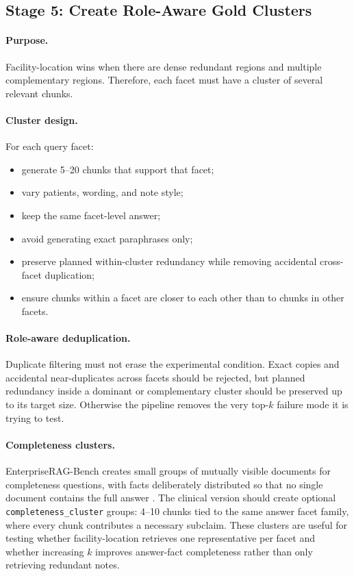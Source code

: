 \documentclass[11pt,a4paper]{article}
\newcommand{\field}[1]{\texttt{#1}}
\newcommand{\stage}[2]{\subsection{\textcolor{betterblue}{#1}: #2}}
\begin{document}
\stage{Stage 5}{Create Role-Aware Gold Clusters}

\paragraph{Purpose.}
Facility-location wins when there are dense redundant regions and multiple complementary regions. Therefore, each facet must have a cluster of several relevant chunks.

\paragraph{Cluster design.}
For each query facet:

\begin{itemize}[leftmargin=*]
	\item generate 5--20 chunks that support that facet;
	\item vary patients, wording, and note style;
	\item keep the same facet-level answer;
	\item avoid generating exact paraphrases only;
	\item preserve planned within-cluster redundancy while removing accidental cross-facet duplication;
	\item ensure chunks within a facet are closer to each other than to chunks in other facets.
\end{itemize}

\paragraph{Role-aware deduplication.}
Duplicate filtering must not erase the experimental condition. Exact copies and accidental near-duplicates across facets should be rejected, but planned redundancy inside a dominant or complementary cluster should be preserved up to its target size. Otherwise the pipeline removes the very top-$k$ failure mode it is trying to test.

\paragraph{Completeness clusters.}
EnterpriseRAG-Bench creates small groups of mutually visible documents for completeness questions, with facts deliberately distributed so that no single document contains the full answer \citep{sun2026enterpriseragbench}. The clinical version should create optional \field{completeness\_cluster} groups: 4--10 chunks tied to the same answer facet family, where every chunk contributes a necessary subclaim. These clusters are useful for testing whether facility-location retrieves one representative per facet and whether increasing $k$ improves answer-fact completeness rather than only retrieving redundant notes.
\end{document}
